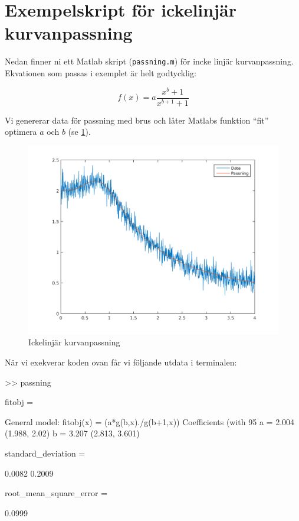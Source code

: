 \section{Exempelskript för ickelinjär kurvanpassning}
\label{sec:matlab-nonlinear}
Nedan finner ni ett Matlab skript ({\tt passning.m}) för incke linjär kurvanpassning.
Ekvationen som passas i exemplet är helt godtycklig:

\begin{equation}
  \label{eq:ex}
  f(x) = a\frac{x^b+1}{x^{b+1}+1}
\end{equation}

Vi genererar data för passning med brus och låter Matlabs funktion
``fit'' optimera $a$ och $b$ (se \cref{fig:matlab-nonlinear}).

\begin{figure}
  \centering
  \includegraphics[scale=0.5]{matlab/passning.png}
  \caption{Ickelinjär kurvanpassning}
  \label{fig:matlab-nonlinear}
\end{figure}


När vi exekverar koden ovan får vi följande utdata i terminalen:

\begin{terminaloutput}
>> passning

fitobj = 

     General model:
     fitobj(x) = (a*g(b,x)./g(b+1,x))
     Coefficients (with 95%
       a =       2.004  (1.988, 2.02)
       b =       3.207  (2.813, 3.601)

standard_deviation =

    0.0082    0.2009


root_mean_square_error =

    0.0999
\end{terminaloutput}

